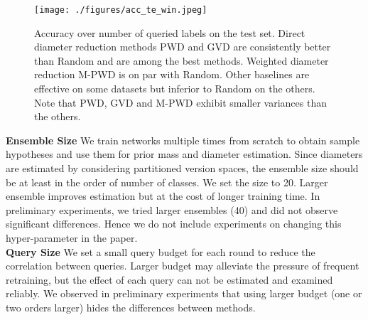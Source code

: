 \documentclass[runningheads, envcountsame, a4paper]{llncs}
\begin{document}
\begin{table*}[b]
\caption{Settings for each dataset used in the active learning experiments.}
\begin{center}
\end{center}
\label{tab:set_al}
\end{table*}

\begin{figure*}[t!]
	\begin{center}
		\texttt{[image: ./figures/acc\_te\_win.jpeg]}
	\end{center}
	\caption{Accuracy over number of queried labels on the test set. Direct diameter reduction methods PWD and GVD are consistently better than Random and are among the best methods. Weighted diameter reduction M-PWD is on par with Random. Other baselines are effective on some datasets but inferior to Random on the others. Note that PWD, GVD and M-PWD exhibit smaller variances than the others.}
	\label{fig:acc_te}
\end{figure*}


\noindent\textbf{Ensemble Size} 
We train networks multiple times from scratch to obtain sample hypotheses and use them for prior mass and diameter estimation. Since diameters are estimated by considering partitioned version spaces, the ensemble size should be at least in the order of number of classes. We set the size to 20. Larger ensemble improves estimation but at the cost of longer training time. In preliminary experiments, we tried larger ensembles (40) and did not observe significant differences. Hence we do not include experiments on changing this hyper-parameter in the paper. \\

\noindent\textbf{Query Size} 
We set a small query budget for each round to reduce the correlation between queries. Larger budget may alleviate the pressure of frequent retraining, but the effect of each query can not be estimated and examined reliably. We observed in preliminary experiments that using larger budget (one or two orders larger) hides the differences between methods. 
\end{document}
